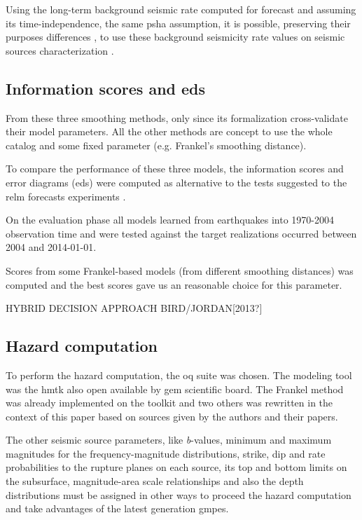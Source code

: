 \documentclass[draft, grl]{agutex}
\begin{document}
\begin{article}
Using the long-term background seismic rate computed for forecast and assuming its time-independence, the same \gls{psha} assumption, it is possible, preserving their purposes differences \citep{marzocchi_2011}, to use these background seismicity rate values on seismic sources characterization \citep{weatherill_pagani_2014}.


\subsection{Information scores and \glspl{ed}}

From these three smoothing methods, only \cite{helmstetter_2012} since its formalization cross-validate their model parameters. All the other methods are concept to use the whole catalog and some fixed parameter (e.g. Frankel's smoothing distance).

To compare the performance of these three models, the information scores and error diagrams (\glspl{ed}) \citep{molchan_1992, kagan_2007, kagan_2009} were computed as alternative to the tests suggested to the \gls{relm} forecasts experiments \citep{schorlemmer_2007}.

On the evaluation phase all models learned from earthquakes into 1970-2004 observation time and were tested against the target realizations occurred between 2004 and 2014-01-01.

Scores from some Frankel-based models (from different smoothing distances) was computed and the best scores gave us an reasonable choice for this parameter.

HYBRID DECISION APPROACH BIRD/JORDAN[2013?]

\subsection{Hazard computation}


To perform the hazard computation, the \acrfull{oq} suite \citep{pagani_2014} was chosen. The modeling tool was the \gls{hmtk} also open available by \gls{gem} scientific board. The Frankel method was already implemented on the toolkit and two others was rewritten in the context of this paper based on sources given by the authors and their papers. %

The other seismic source parameters, like \emph{b}-values, minimum and maximum magnitudes for the frequency-magnitude distributions, strike, dip and rate probabilities to the rupture planes on each source, its top and bottom limits on the subsurface, magnitude-area scale relationships and also the depth distributions must be assigned in other ways to proceed the hazard computation and take advantages of the latest generation \glspl{gmpe}.


\end{article}
\end{document}
